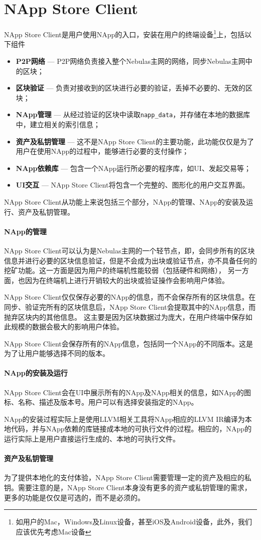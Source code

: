 \section{NApp Store Client}
NApp Store Client是用户使用NApp的入口，安装在用户的终端设备\footnote{如用户的Mac，Windows及Linux设备，甚至iOS及Android设备，此外，我们应该优先考虑Mac设备}上，包括以下组件
\begin{itemize}
\item \textbf{P2P网络} --- P2P网络负责接入整个Nebulas主网的网络，同步Nebulas主网中的区块；
\item \textbf{区块验证} --- 负责对接收到的区块进行必要的验证，丢掉不必要的、无效的区块；
\item \textbf{NApp管理} --- 从经过验证的区块中读取\texttt{napp\_data}，并存储在本地的数据库中，建立相关的索引信息；
\item \textbf{资产及私钥管理} --- 这不是NApp Store Client的主要功能，此功能仅仅是为了用户在使用NApp的过程中，能够进行必要的支付操作；
\item \textbf{NApp依赖库} --- 包含一个NApp运行所必要的程序库，如UI、发起交易等；
\item \textbf{UI交互} --- NApp Store Client将包含一个完整的、图形化的用户交互界面。
\end{itemize}

NApp Store Client从功能上来说包括三个部分，NApp的管理、NApp的安装及运行、资产及私钥管理。
\paragraph{NApp的管理}
NApp Store Client可以认为是Nebulas主网的一个轻节点，即，会同步所有的区块信息并进行必要的区块信息验证，但是不会成为出块或验证节点，亦不具备任何的挖矿功能。这一方面是因为用户的终端机性能较弱（包括硬件和网络），
另一方面，也因为在终端机上进行开销较大的出块或验证操作会影响用户体验。

NApp Store Client仅仅保存必要的NApp的信息，而不会保存所有的区块信息。在同步、验证完所有的区块信息后，NApp Store Client会提取其中的NApp信息，而抛弃区块内的其他信息。
这主要是因为区块数据过为庞大，在用户终端中保存如此规模的数据会极大的影响用户体验。

NApp Store Client会保存所有的NApp信息，包括同一个NApp的不同版本。这是为了让用户能够选择不同的版本。
\paragraph{NApp的安装及运行}
NApp Store Client会在UI中展示所有的NApp及NApp相关的信息，如NApp的图标、名称、描述及版本号。用户可以有选择安装指定的NApp。

NApp的安装过程实际上是使用LLVM相关工具将NApp相应的LLVM IR编译为本地代码，并与NApp依赖的库链接成本地的可执行文件的过程。相应的，NApp的运行实际上是用户直接运行生成的、本地的可执行文件。

\paragraph{资产及私钥管理}
为了提供本地化的支付体验，NApp Store Client需要管理一定的资产及相应的私钥。需要注意的是，NApp Store Client本身没有更多的资产或私钥管理的需求，更多的功能是仅仅是可选的，而不是必须的。